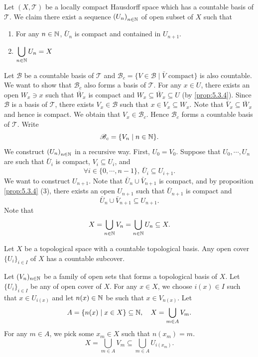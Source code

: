 \begin{propositionenv}\label{prop:5.3.7}
    Let $(X,\mathscr{T})$ be a locally compact Hausdorff space which has a countable basis of $\mathscr{T}$.
    We claim there exist a sequence $\left(U_n\right)_{n \in \mathbb{N}}$ of open subset of $X$ such that
    \begin{enumerate}
        \item For any $n \in \mathbb{N}$, $\bar{U}_n$ is compact and contained in $U_{n+1}$.
        \item $\displaystyle \bigcup_{n \in \mathbb{N}} U_n = X$
    \end{enumerate}
\end{propositionenv}
\begin{proofenv}
    Let $\mathscr{B}$ be a countable basis of $\mathscr{T}$ and $\mathscr{B}_c = \{V \in \mathscr{B} \mid \bar{V} \text{ compact}\}$ is also countable.
    We want to show that $\mathscr{B}_c$ also forms a basis of $\mathscr{T}$.
    For any $x \in U$, there exists an open $W_x \ni x$ such that $\bar{W}_x$ is compact and $W_x \subseteq \bar{W}_x \subseteq U$ (by \ref{prop:5.3.4}).
    Since $\mathscr{B}$ is a basis of $\mathscr{T}$, there exists $V_x \in \mathscr{B}$ such that $x \in V_x \subseteq W_x$.
    Note that $\bar{V}_x \subseteq \bar{W}_x$  and hence is compact.
    We obtain that $V_x \in \mathscr{B}_c$.
    Hence $\mathscr{B}_c$ forms a countable basis of $\mathscr{T}$.
    Write
    $$\mathscr{B}_c = \{V_n \mid n \in \mathbb{N}\}.$$
    We construct $\left(U_n\right)_{n\in \mathbb{N}}$ in a recursive way.
    First, $U_0 = V_0$.
    Suppose that $U_0,\cdots,U_n$ are such that $\bar{U}_{i}$ is compact, $V_i \subseteq U_i$, and
    $$\forall i \in \{0,\cdots,n-1\},\ \bar{U}_{i} \subseteq U_{i+1}.$$
    We want to construct $U_{n+1}$.
    Note that $\bar{U}_{n} \cup \bar{V}_{n+1}$ is compact,
    and by proposition \ref{prop:5.3.4} (3), there exists an open $U_{n+1}$ such that $\bar{U}_{n+1}$ is compact and 
    $$\bar{U}_{n} \cup \bar{V}_{n+1} \subseteq U_{n+1}.$$
    Note that
    $$X = \bigcup_{n \in \mathbb{N}} V_{n} = \bigcup_{n \in \mathbb{N}} U_{n} \subseteq X.$$
\end{proofenv}

\begin{lemmaenv}\label{lem:5.3.8}
    Let $X$ be a topological space with a countable topological basis.
    Any open cover $\{U_i\}_{i\in I}$ of $X$ has a countable subcover.
\end{lemmaenv}
\begin{proofenv}
    Let $(V_n)_{n\in \mathbb{N}}$ be a family of open sets that forms a topological basis of $X$.
    Let $\{U_i\}_{i\in I}$ be any of open cover of $X$.
    For any $x \in X$, we choose $i(x) \in I$ such that $x \in U_{i(x)}$ and let $n(x) \in \mathbb{N}$ be such that $x \in V_{n(x)}$.
    Let
    $$A = \{n(x) \mid x \in X\} \subseteq \mathbb{N},\quad X = \bigcup_{m \in A} V_{m}.$$
    For any $m \in A$, we pick some $x_m \in X$ such that $n(x_m) = m$.
    $$X = \bigcup_{m \in A} V_{m} \subseteq \bigcup_{m \in A} U_{i(x_m)}.$$
\end{proofenv}

